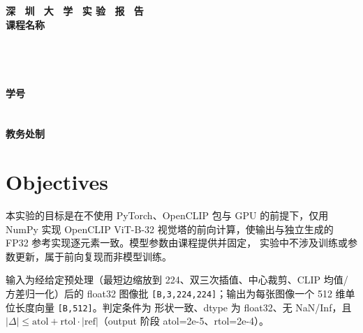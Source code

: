 \documentclass[a4paper,12pt]{article}
\begin{document}
\begin{titlepage}
    \centering
    \vspace*{2cm}
    \Huge{\textbf{深 \ 圳 \ 大 \ 学 \ 实 验  \ 报 \ 告}}\\[1.5cm]

    {\Large\textbf{课程名称}\quad\underline{}}\\[0.5cm]
{\Large
\noindent{}
\underline{}}\\[0.5cm]
{\Large
\noindent{}
\underline{}}\\[0.5cm]
{\Large
\noindent{}
\underline{\makebox[8cm][c]{}}}\\[0.5cm]
{\Large
\noindent{}
\underline{}}\\[0.5cm]
{\Large
\noindent{}
\underline{\makebox[3cm][c]{}}
\hspace{0.5cm}
\textbf{学号}
\underline{\makebox[3cm][c]{}}}\\[0.5cm]
{\Large
\noindent{}
\underline{\makebox[8cm][c]{}}}\\[0.5cm]
{\Large
\noindent{}
\underline{\makebox[8cm][c]{}}}\\[1.5cm]

    \vfill
    \Large{\textbf{教务处制}}
\end{titlepage}

\newpage


\section{Objectives}

本实验的目标是在不使用 PyTorch、OpenCLIP 包与 GPU 的前提下，仅用 NumPy 实现 OpenCLIP
ViT-B-32 视觉塔的前向计算，使输出与独立生成的 FP32 参考实现逐元素一致。模型参数由课程提供并固定，
实验中不涉及训练或参数更新，属于前向复现而非模型训练。

输入为经给定预处理（最短边缩放到 224、双三次插值、中心裁剪、CLIP 均值/方差归一化）后的 float32
图像批 \texttt{[B,3,224,224]}；输出为每张图像一个 512 维单位长度向量 \texttt{[B,512]}。判定条件为
形状一致、dtype 为 float32、无 NaN/Inf，且
\(|\Delta| \le \mathrm{atol} + \mathrm{rtol}\cdot|\mathrm{ref}|\)（output 阶段 atol=2e-5、rtol=2e-4）。
\end{document}
